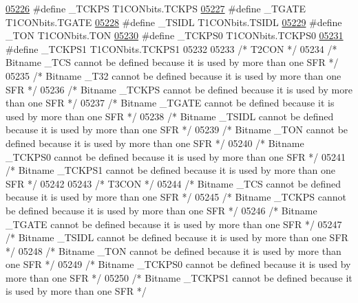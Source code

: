 \begin{DoxyCode}
\hypertarget{a00009_source_l05226}{}\hyperlink{a00009_a40576ef0b8ce130c941a4a1baa53264d}{05226} \textcolor{preprocessor}{#define \_TCKPS T1CONbits.TCKPS}
\hypertarget{a00009_source_l05227}{}\hyperlink{a00009_ab42cc64c55fdca6cb6444d87c26dd6ce}{05227} \textcolor{preprocessor}{#define \_TGATE T1CONbits.TGATE}
\hypertarget{a00009_source_l05228}{}\hyperlink{a00009_aa16ced5b84e8061182a0b5aff865d9bc}{05228} \textcolor{preprocessor}{#define \_TSIDL T1CONbits.TSIDL}
\hypertarget{a00009_source_l05229}{}\hyperlink{a00009_afaf4a32fc181a1178cc7bb90b3c8640f}{05229} \textcolor{preprocessor}{#define \_TON T1CONbits.TON}
\hypertarget{a00009_source_l05230}{}\hyperlink{a00009_a995b8943ae80b8855b86284ac7e1fe79}{05230} \textcolor{preprocessor}{#define \_TCKPS0 T1CONbits.TCKPS0}
\hypertarget{a00009_source_l05231}{}\hyperlink{a00009_ab4c4c1d485360364ec97952c599971a9}{05231} \textcolor{preprocessor}{#define \_TCKPS1 T1CONbits.TCKPS1}
05232 
05233 \textcolor{comment}{/* T2CON */}
05234 \textcolor{comment}{/* Bitname \_TCS cannot be defined because it is used by more than one SFR */}
05235 \textcolor{comment}{/* Bitname \_T32 cannot be defined because it is used by more than one SFR */}
05236 \textcolor{comment}{/* Bitname \_TCKPS cannot be defined because it is used by more than one SFR */}
05237 \textcolor{comment}{/* Bitname \_TGATE cannot be defined because it is used by more than one SFR */}
05238 \textcolor{comment}{/* Bitname \_TSIDL cannot be defined because it is used by more than one SFR */}
05239 \textcolor{comment}{/* Bitname \_TON cannot be defined because it is used by more than one SFR */}
05240 \textcolor{comment}{/* Bitname \_TCKPS0 cannot be defined because it is used by more than one SFR */}
05241 \textcolor{comment}{/* Bitname \_TCKPS1 cannot be defined because it is used by more than one SFR */}
05242 
05243 \textcolor{comment}{/* T3CON */}
05244 \textcolor{comment}{/* Bitname \_TCS cannot be defined because it is used by more than one SFR */}
05245 \textcolor{comment}{/* Bitname \_TCKPS cannot be defined because it is used by more than one SFR */}
05246 \textcolor{comment}{/* Bitname \_TGATE cannot be defined because it is used by more than one SFR */}
05247 \textcolor{comment}{/* Bitname \_TSIDL cannot be defined because it is used by more than one SFR */}
05248 \textcolor{comment}{/* Bitname \_TON cannot be defined because it is used by more than one SFR */}
05249 \textcolor{comment}{/* Bitname \_TCKPS0 cannot be defined because it is used by more than one SFR */}
05250 \textcolor{comment}{/* Bitname \_TCKPS1 cannot be defined because it is used by more than one SFR */}

\end{DoxyCode}
